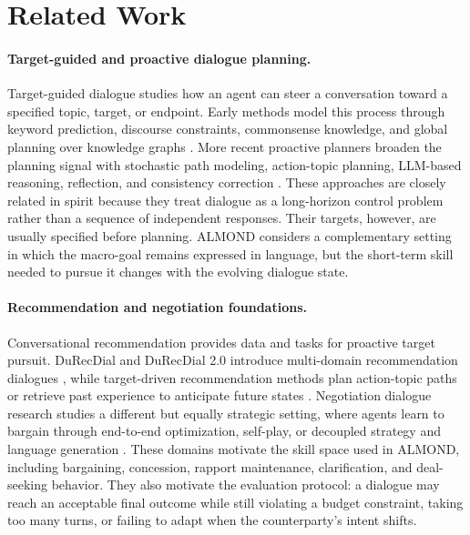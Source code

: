 \section{Related Work}

\paragraph{Target-guided and proactive dialogue planning.}
Target-guided dialogue studies how an agent can steer a conversation toward a
specified topic, target, or endpoint. Early methods model this process through
keyword prediction, discourse constraints, commonsense knowledge, and global
planning over knowledge graphs
\cite{tang-etal-2019-target,qin2020dynamic,zhong2021keyword,kishinami-etal-2022-target,yang-etal-2022-topkg}.
More recent proactive planners broaden the planning signal with stochastic path
modeling, action-topic planning, LLM-based reasoning, reflection, and
consistency correction
\cite{wang-etal-2023-dialogue,wang2024target,zheng-etal-2024-thoughts,guo-etal-2024-pcqpr,zhang-etal-2025-enhancing-goal}.
These approaches are closely related in spirit because they treat dialogue as a
long-horizon control problem rather than a sequence of independent responses.
Their targets, however, are usually specified before planning. ALMOND considers
a complementary setting in which the macro-goal remains expressed in language,
but the short-term skill needed to pursue it changes with the evolving dialogue
state.

\paragraph{Recommendation and negotiation foundations.}
Conversational recommendation provides data and tasks for proactive target
pursuit. DuRecDial and DuRecDial 2.0 introduce multi-domain recommendation
dialogues
\cite{liu-etal-2020-towards-conversational,liu-etal-2021-durecdial}, while
target-driven recommendation methods plan action-topic paths or retrieve past
experience to anticipate future states
\cite{wang2022follow,dao-etal-2024-experience}. Negotiation dialogue research
studies a different but equally strategic setting, where agents learn to bargain
through end-to-end optimization, self-play, or decoupled strategy and language
generation \cite{lewis-etal-2017-deal,he-etal-2018-decoupling}. These domains
motivate the skill space used in ALMOND, including bargaining, concession,
rapport maintenance, clarification, and deal-seeking behavior. They also
motivate the evaluation protocol: a dialogue may reach an acceptable final
outcome while still violating a budget constraint, taking too many turns, or
failing to adapt when the counterparty's intent shifts.

